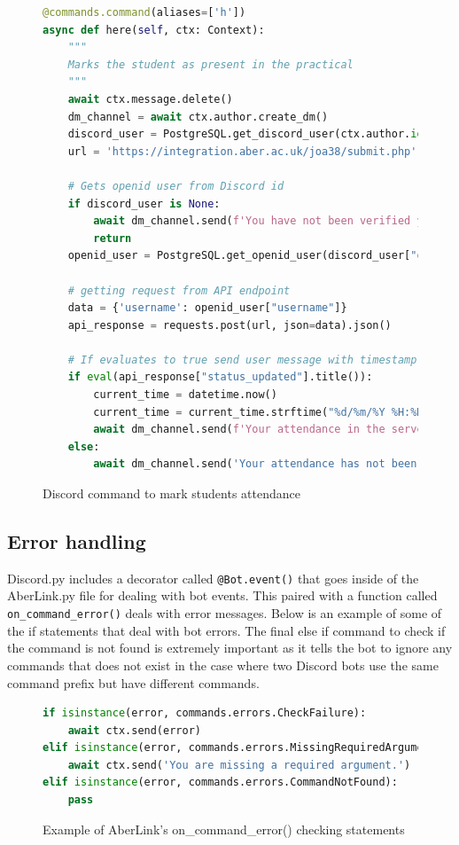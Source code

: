 \begin{figure}[H]
\begin{lstlisting}[language=Python]
@commands.command(aliases=['h'])
async def here(self, ctx: Context):
	"""
	Marks the student as present in the practical
	"""
	await ctx.message.delete()
	dm_channel = await ctx.author.create_dm()
	discord_user = PostgreSQL.get_discord_user(ctx.author.id)
	url = 'https://integration.aber.ac.uk/joa38/submit.php'

	# Gets openid user from Discord id
	if discord_user is None:
		await dm_channel.send(f'You have not been verified yet. Please visit {WEBSITE} to get verified')
		return
	openid_user = PostgreSQL.get_openid_user(discord_user["openidc_id"])

	# getting request from API endpoint
	data = {'username': openid_user["username"]}
	api_response = requests.post(url, json=data).json()

	# If evaluates to true send user message with timestamp
	if eval(api_response["status_updated"].title()):
		current_time = datetime.now()
		current_time = current_time.strftime("%d/%m/%Y %H:%M:%S")
		await dm_channel.send(f'Your attendance in the server `{ctx.guild.name}` has been recorded for the module: `{api_response["module_code"]}` with timestamp: `{current_time}`')
	else:
		await dm_channel.send('Your attendance has not been recorded for this practical. If you believe this is incorrect please contact your module coordinator.')
\end{lstlisting}
\caption{Discord command to mark students attendance}
\label{fig:discord-here-cmd}
\end{figure}

\subsection{Error handling}
Discord.py includes a decorator called \verb|@Bot.event()| that goes inside of the AberLink.py file for dealing with bot events. This paired with a function called \verb|on_command_error()| deals with error messages. Below is an example of some of the if statements that deal with bot errors. The final else if command to check if the command is not found is extremely important as it tells the bot to ignore any commands that does not exist in the case where two Discord bots use the same command prefix but have different commands.

\begin{figure}[H]
\begin{lstlisting}[language=Python]
if isinstance(error, commands.errors.CheckFailure):
	await ctx.send(error)
elif isinstance(error, commands.errors.MissingRequiredArgument):
	await ctx.send('You are missing a required argument.')
elif isinstance(error, commands.errors.CommandNotFound):
	pass
\end{lstlisting}
\caption{Example of AberLink's on\_command\_error() checking statements}
\label{fig:discord-error-checking}
\end{figure}

